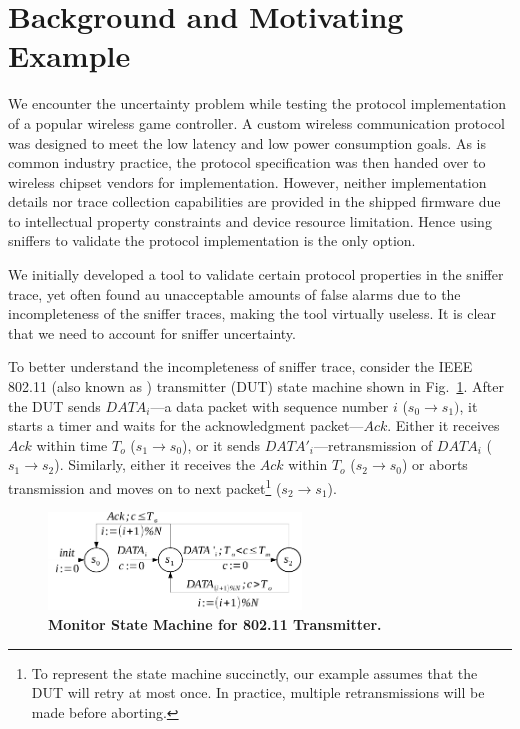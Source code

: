 \section{Background and Motivating Example}
\label{sec:motivation}

We encounter the uncertainty problem while testing the protocol implementation
of a popular wireless game controller. A custom wireless communication protocol
was designed to meet the low latency and low power consumption goals. As is
common industry practice, the protocol specification was then handed over to
wireless chipset vendors for implementation. However, neither implementation
details nor trace collection capabilities are provided in the shipped firmware
due to intellectual property constraints and device resource limitation. Hence
using sniffers to validate the protocol implementation is the only option.

We initially developed a tool to validate certain protocol properties in the
sniffer trace, yet often found au unacceptable amounts of false alarms due to
the incompleteness of the sniffer traces, making the tool virtually useless. It
is clear that we need to account for sniffer uncertainty.

To better understand the incompleteness of sniffer trace, consider the IEEE
802.11 (also known as \wifi{}) transmitter (DUT) state machine shown in
Fig.~\ref{fig:dot11_tx_ta}. After the DUT sends $DATA_i$---a data packet with
sequence number $i$ ($s_0\rightarrow s_1)$, it starts a timer and waits for the
acknowledgment packet---$Ack$. Either it receives $Ack$ within time $T_o$
($s_1\rightarrow s_0$), or it sends $DATA'_i$---retransmission of $DATA_i$
($s_1\rightarrow s_2$). Similarly, either it receives the $Ack$ within $T_o$
($s_2\rightarrow s_0$) or aborts transmission and moves on to next
packet\footnote{To represent the state machine succinctly, our example assumes
that the DUT will retry at most once. In practice, multiple retransmissions
will be made before aborting.} ($s_2\rightarrow s_1$).

\begin{figure}[H]
  \centering
  \includegraphics[width=0.6\textwidth]{./figures/dot11_tx_ta.pdf}
  \caption{\textbf{Monitor State Machine for 802.11 Transmitter.}}
  \label{fig:dot11_tx_ta}
  \vspace*{-5mm}
\end{figure}


